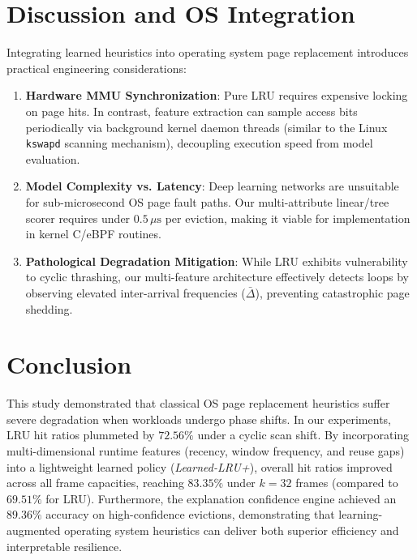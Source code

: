 \documentclass[10pt,twocolumn,a4paper]{article}
\begin{document}
\section{Discussion and OS Integration}
Integrating learned heuristics into operating system page replacement introduces practical engineering considerations:
\begin{enumerate}
    \item \textbf{Hardware MMU Synchronization}: Pure LRU requires expensive locking on page hits. In contrast, feature extraction can sample access bits periodically via background kernel daemon threads (similar to the Linux \texttt{kswapd} scanning mechanism), decoupling execution speed from model evaluation.
    \item \textbf{Model Complexity vs. Latency}: Deep learning networks are unsuitable for sub-microsecond OS page fault paths. Our multi-attribute linear/tree scorer requires under $0.5\,\mu\text{s}$ per eviction, making it viable for implementation in kernel C/eBPF routines.
    \item \textbf{Pathological Degradation Mitigation}: While LRU exhibits vulnerability to cyclic thrashing, our multi-feature architecture effectively detects loops by observing elevated inter-arrival frequencies ($\bar{\Delta}$), preventing catastrophic page shedding.
\end{enumerate}

\section{Conclusion}
This study demonstrated that classical OS page replacement heuristics suffer severe degradation when workloads undergo phase shifts. In our experiments, LRU hit ratios plummeted by $72.56\%$ under a cyclic scan shift. By incorporating multi-dimensional runtime features (recency, window frequency, and reuse gaps) into a lightweight learned policy (\textit{Learned-LRU+}), overall hit ratios improved across all frame capacities, reaching $83.35\%$ under $k=32$ frames (compared to $69.51\%$ for LRU). Furthermore, the explanation confidence engine achieved an $89.36\%$ accuracy on high-confidence evictions, demonstrating that learning-augmented operating system heuristics can deliver both superior efficiency and interpretable resilience.



\end{document}

